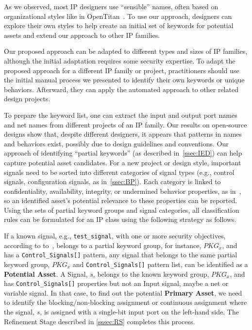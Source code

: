 As we observed, most IP designers use ``sensible'' names, often based on organizational styles like in OpenTitan~\cite{opentitan_open_nodate}. 
To use our approach, designers can explore their own styles to help create an initial set of keywords for potential assets and extend our approach to other IP families. 

Our proposed approach can be adapted to different types and sizes of IP families, although the initial adaptation requires some security expertise. 
To adapt the proposed approach for a different IP family or project, practitioners should use the initial manual process we presented to identify their own keywords or unique behaviors. Afterward, they can apply the automated approach to other related design projects. 

To prepare the keyword list, one can extract the input and output port names and net names from different projects of an IP family. 
Our results on open-source designs show that, despite different designers, it appears that patterns in names and behaviors exist, possibly due to design guidelines and conventions. 
Our approach of identifying ``partial keywords'' (as described in~\autoref{ssec:IED}) can help capture potential asset candidates.  
For a new project or design style, important signals need to be sorted into different categories of signal types (e.g., control signals, configuration signals, as in~\autoref{ssec:BP}).
Each category is linked to confidentiality, availability, integrity, or undermined behavior properties, as in~\cite{ieee_p3164_working_group_asset_2024}, so an identified asset's potential relevance to these properties can be reported. 
Using the sets of partial keyword groups and signal categories, all classification rules can be formulated for an IP class using the following strategy as follows. 

If a known signal, e.g., \texttt{test\_signal}, with one or more security objectives, according to to~\cite{ieee_p3164_working_group_asset_2024}, belongs to a partial keyword group, for instance, $PKG_{x}$, and has a \texttt{Control\_Signals[]} pattern, any signal that belongs to the same partial keyword group, $PKG_{x}$ and \texttt{Control\_Signals[]} pattern list, can be identified as a \textbf{Potential Asset}. A Signal, $s$, belongs to the known keyword group, $PKG_{x}$, and has \texttt{Control\_Signals[]} properties but not an Input signal, maybe a net or variable signal. In that case, to find out the potential \textbf{Primary Asset}, we need to identify the blocking/non-blocking assignment or continuous assignment where the signal, $s$, is assigned with a single-bit input port on the left-hand side. The Refinement Stage described in \autoref{sssec:RS} completes this process. 
